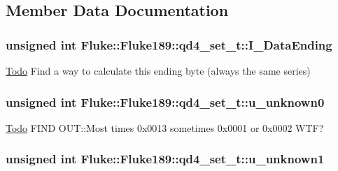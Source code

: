 \subsection{Member Data Documentation}
\hypertarget{structFluke_1_1Fluke189_1_1qd4__set__t_a08bcc1ec254053f32250beb7ae3e7219}{
\subsubsection[{I\_\-DataEnding}]{\setlength{\rightskip}{0pt plus 5cm}unsigned int {\bf Fluke::Fluke189::qd4\_\-set\_\-t::I\_\-DataEnding}}}
\label{structFluke_1_1Fluke189_1_1qd4__set__t_a08bcc1ec254053f32250beb7ae3e7219}
\begin{Desc}
\item[\hyperlink{todo__todo000021}{Todo}]Find a way to calculate this ending byte (always the same series) \end{Desc}
\hypertarget{structFluke_1_1Fluke189_1_1qd4__set__t_a35c68a594812dba53791a2e32dbfacb6}{
\subsubsection[{u\_\-unknown0}]{\setlength{\rightskip}{0pt plus 5cm}unsigned int {\bf Fluke::Fluke189::qd4\_\-set\_\-t::u\_\-unknown0}}}
\label{structFluke_1_1Fluke189_1_1qd4__set__t_a35c68a594812dba53791a2e32dbfacb6}
\begin{Desc}
\item[\hyperlink{todo__todo000018}{Todo}]FIND OUT::Most times 0x0013 sometimes 0x0001 or 0x0002 WTF? \end{Desc}
\hypertarget{structFluke_1_1Fluke189_1_1qd4__set__t_aa49bec7dfd9d22c392297cdff277afd9}{
\subsubsection[{u\_\-unknown1}]{\setlength{\rightskip}{0pt plus 5cm}unsigned int {\bf Fluke::Fluke189::qd4\_\-set\_\-t::u\_\-unknown1}}}
